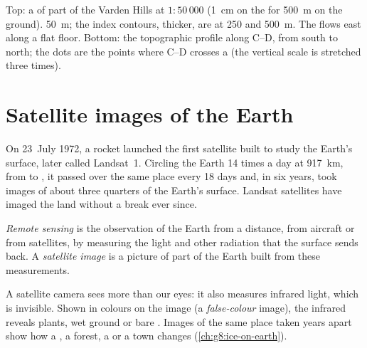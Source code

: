 \begin{omfigure}
{\small Top: a  of part of the Varden Hills at $1 : 50\,000$
(1~cm on the  for \qty{500}{m} on the ground). 
\qty{50}{m}; the index contours, thicker, are at 250 and \qty{500}{m}. The
 flows east along a flat  floor. Bottom: the topographic profile
along C--D, from south to north; the dots are the points where C--D
crosses a  (the vertical scale is stretched three times).}
\label{fig:g9:maps-of-the-earth:topo}
\end{omfigure}

\section{Satellite images of the Earth}

On 23~July 1972, a rocket launched the first satellite built to study the
Earth's surface, later called Landsat~1. Circling the Earth 14 times a day
at \qty{917}{km}, from  to , it passed over the same place every 18
days and, in six years, took images of about three quarters of the Earth's
surface. Landsat satellites have imaged the land without a break ever
since.

\begin{definition}\label{def:g9:maps-of-the-earth:remote-sensing}
\emph{Remote sensing} is the observation of the
Earth from a distance, from aircraft or from satellites, by measuring the
light and other radiation that the surface sends back. A \emph{satellite
image} is a picture of part of the Earth built from
these measurements.
\end{definition}

A satellite camera sees more than our eyes: it also measures infrared light,
which is invisible. Shown in colours on the image (a \emph{false-colour}
image), the infrared reveals plants, wet ground or bare . Images of the
same place taken years apart show how a , a forest, a  or a
town changes (\cref{ch:g8:ice-on-earth}).

